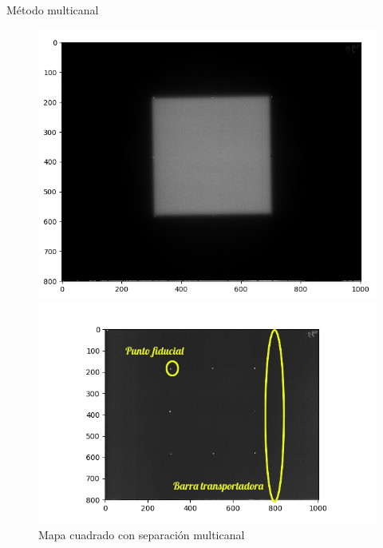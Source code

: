 \documentclass[12pt]{beamer}
\begin{document}
\begin{frame}{Método multicanal}
\begin{figure}[htp]%
	\centering
	\begin{minipage}{0.45\textwidth}
		\includegraphics[width=\textwidth]{images/mapaCuadradoConMulticanal.png}
	\end{minipage}\hfill
	\begin{minipage}{0.6\textwidth}
		\includegraphics[width=\textwidth]{images/fondoCuadradoConLabel.png}
	\end{minipage}
	\caption{Mapa cuadrado con separación multicanal}
\end{figure}
\end{frame}
\end{document}
